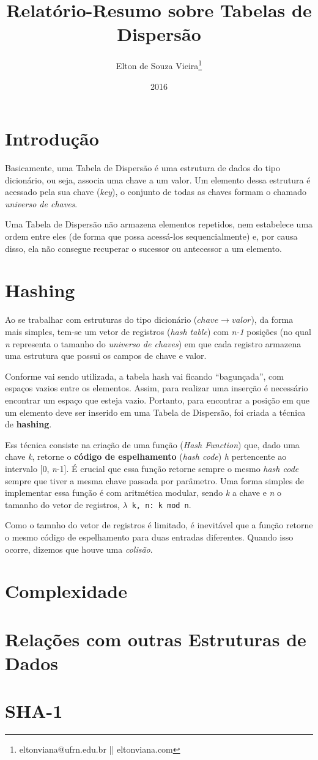 \documentclass[12pt,openright,oneside,a4paper,english,brazil]{abntex2}
\author{Elton de Souza Vieira\thanks{eltonviana@ufrn.edu.br || eltonviana.com}}
\title{Relatório-Resumo sobre Tabelas de Dispersão}
\date{2016}
\newcommand{\code}[1]{\colorbox{codegray}{\texttt{#1}}}
\begin{document}
\imprimircapa

\section*{Introdução}
    Basicamente, uma Tabela de Dispersão é uma estrutura de dados do tipo dicionário, ou seja, associa uma chave a um valor.
    Um elemento dessa estrutura é acessado pela sua chave (\textit{key}), o conjunto de todas as chaves formam o chamado \textit{universo de chaves}.

    Uma Tabela de Dispersão não armazena elementos repetidos, nem estabelece uma ordem entre eles (de forma que possa acessá-los sequencialmente) e, por causa disso, ela não consegue recuperar o sucessor ou antecessor a um elemento.

\section*{Hashing}
    Ao se trabalhar com estruturas do tipo dicionário (${chave}\rightarrow{valor}$), da forma mais simples, tem-se um vetor de registros (\textit{hash table}) com \textit{n-1} posições (no qual \textit{n} representa o tamanho do \textit{universo de chaves}) em que cada registro armazena uma estrutura que possui os campos de chave e valor.

    Conforme vai sendo utilizada, a tabela hash vai ficando ``bagunçada'', com espaços vazios entre os elementos. Assim, para realizar uma inserção é necessário encontrar um espaço que esteja vazio.
    Portanto, para encontrar a posição em que um elemento deve ser inserido em uma Tabela de Dispersão, foi criada a técnica de \textbf{hashing}.

    Ess técnica consiste na criação de uma função (\textit{Hash Function}) que, dado uma chave \textit{k}, retorne o \textbf{código de espelhamento} (\textit{hash code}) \textit{h} pertencente ao intervalo [0, \textit{n}-1].
    É crucial que essa função retorne sempre o mesmo \textit{hash code} sempre que tiver a mesma chave passada por parâmetro.
    Uma forma simples de implementar essa função é com aritmética modular, sendo \textit{k} a chave e \textit{n} o tamanho do vetor de registros, \code{$\lambda$ k, n: k mod n}.

    Como o tamnho do vetor de registros é limitado, é inevitável que a função retorne o mesmo código de espelhamento para duas entradas diferentes.
    Quando isso ocorre, dizemos que houve uma \textit{colisão}.

\section*{Complexidade}

\section*{Relações com outras Estruturas de Dados}

\section*{SHA-1}
\end{document}
